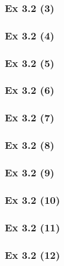 \subsubsection{Ex 3.2 (3)}\label{sec:Ex_3.2.3}

\subsubsection{Ex 3.2 (4)}\label{sec:Ex_3.2.4}

\subsubsection{Ex 3.2 (5)}\label{sec:Ex_3.2.5}

\subsubsection{Ex 3.2 (6)}\label{sec:Ex_3.2.6}

\subsubsection{Ex 3.2 (7)}\label{sec:Ex_3.2.7}

\subsubsection{Ex 3.2 (8)}\label{sec:Ex_3.2.8}

\subsubsection{Ex 3.2 (9)}\label{sec:Ex_3.2.9}

\subsubsection{Ex 3.2 (10)}\label{sec:Ex_3.2.10}

\newpage		%

\subsubsection{Ex 3.2 (11)}\label{sec:Ex_3.2.11}

\subsubsection{Ex 3.2 (12)}\label{sec:Ex_3.2.12}

